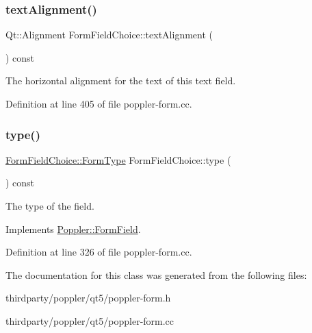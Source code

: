 \mbox{\label{class_poppler_1_1_form_field_choice_a81783a147e0af97a0288fd73506827d9}} 
\subsubsection{\texorpdfstring{text\+Alignment()}{textAlignment()}}
{\footnotesize\ttfamily Qt\+::\+Alignment Form\+Field\+Choice\+::text\+Alignment (\begin{DoxyParamCaption}{ }\end{DoxyParamCaption}) const}

The horizontal alignment for the text of this text field. 

Definition at line 405 of file poppler-\/form.\+cc.

\mbox{\label{class_poppler_1_1_form_field_choice_a54673d557034b798189e809a0b3120df}} 
\subsubsection{\texorpdfstring{type()}{type()}}
{\footnotesize\ttfamily \hyperlink{class_poppler_1_1_form_field_af9b28bf05b29780f81445b21a0ed7423}{Form\+Field\+Choice\+::\+Form\+Type} Form\+Field\+Choice\+::type (\begin{DoxyParamCaption}{ }\end{DoxyParamCaption}) const\hspace{0.3cm}{\ttfamily [virtual]}}

The type of the field. 

Implements \hyperlink{class_poppler_1_1_form_field_aec536e2f0468aedcc6b6d7df034442b2}{Poppler\+::\+Form\+Field}.



Definition at line 326 of file poppler-\/form.\+cc.



The documentation for this class was generated from the following files\+:\begin{DoxyCompactItemize}
\item 
thirdparty/poppler/qt5/poppler-\/form.\+h\item 
thirdparty/poppler/qt5/poppler-\/form.\+cc\end{DoxyCompactItemize}

